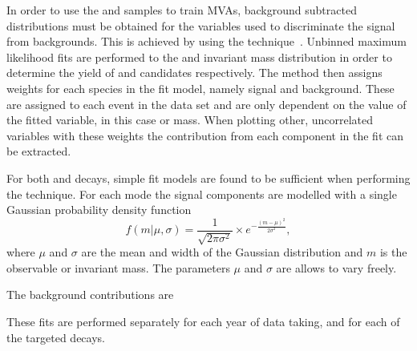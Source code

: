 In order to use the \decay{\Bs}{\jpsi\phiz} and \decay{\Bsb}{\Dsp\pim} samples to train MVAs, background subtracted distributions must be obtained for the variables used to discriminate the signal from backgrounds. This is achieved by using the \sPlot technique~\cite{Pivk:2004ty}. Unbinned maximum likelihood fits are performed to the \Dsp and \phiz invariant mass distribution in order to determine the yield of \Dsp and \phiz candidates respectively. The \sPlot method then assigns weights for each species in the fit model, namely signal and background. These are assigned to each event in the data set and are only dependent on the value of the fitted variable, in this case \phiz or \Dsp mass. When plotting other, uncorrelated variables with these weights the contribution from each component in the fit can be extracted. 

For both \decay{\Bs}{\jpsi\phiz} and \decay{\Bsb}{\Dsp\pim} decays, simple fit models are found to be sufficient when performing the \sPlot technique. For each mode the signal components are modelled with a single Gaussian probability density function
\begin{equation}
f(m|\mu,\sigma) = \frac{1}{\sqrt{2\pi\sigma^{2}}} \times e^{-\frac{(m-\mu)^{2}}{2\sigma^{2}}}, 
\end{equation}
where $\mu$ and $\sigma$ are the mean and width of the Gaussian distribution and $m$ is the observable \phiz or \Dzb invariant mass. The parameters $\mu$ and $\sigma$ are allows to vary freely.

The background contributions are 





These fits are performed separately for each year of data taking, and for each of the targeted decays. 

